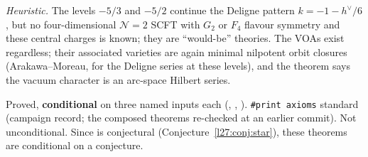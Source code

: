 \begin{physics}
\emph{Heuristic.} The levels $-5/3$ and $-5/2$ continue the Deligne pattern $k=-1-h^\vee/6$, but no four-dimensional $\mathcal N=2$
SCFT with $G_2$ or $F_4$ flavour symmetry and these central charges is known; they are ``would-be'' theories. The VOAs exist regardless;
their associated varieties are again minimal nilpotent orbit closures (Arakawa--Moreau, for the Deligne series at these levels), and
the theorem says the vacuum character is an arc-space Hilbert series.
\end{physics}

\begin{status}
Proved, \textbf{conditional} on three named inputs each (, , ). \texttt{\#print axioms} standard (campaign
record; the composed theorems re-checked at an earlier commit). Not unconditional. Since  is conjectural
(Conjecture~\ref{l27:conj:star}), these theorems are conditional on a conjecture.
\end{status}


